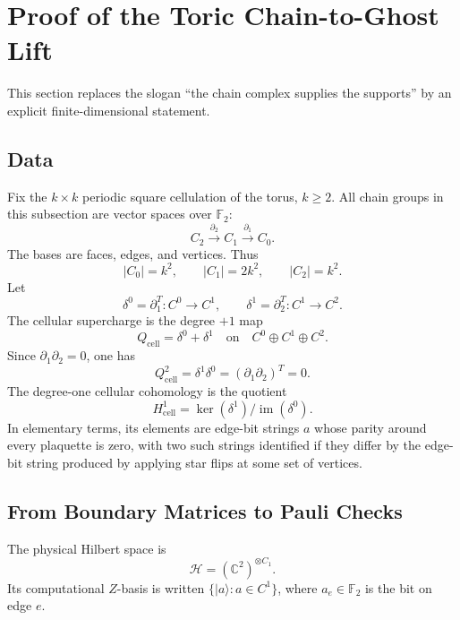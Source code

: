 
\section{Proof of the Toric Chain-to-Ghost Lift}
\label{sec:chain-ghost-proof}

This section replaces the slogan ``the chain complex supplies the supports''
by an explicit finite-dimensional statement.

\subsection{Data}

Fix the \(k\times k\) periodic square cellulation of the torus, \(k\geq 2\).
All chain groups in this subsection are vector spaces over \(\mathbb{F}_2\):
\[
  C_2 \xrightarrow{\partial_2} C_1 \xrightarrow{\partial_1} C_0 .
\]
The bases are faces, edges, and vertices. Thus
\[
  |C_0|=k^2,\qquad |C_1|=2k^2,\qquad |C_2|=k^2 .
\]
Let
\[
  \delta^0=\partial_1^T:C^0\to C^1,\qquad
  \delta^1=\partial_2^T:C^1\to C^2.
\]
The cellular supercharge is the degree \(+1\) map
\[
  Q_{\mathrm{cell}}=\delta^0+\delta^1
  \quad\text{on}\quad C^0\oplus C^1\oplus C^2 .
\]
Since \(\partial_1\partial_2=0\), one has
\[
  Q_{\mathrm{cell}}^2=\delta^1\delta^0=(\partial_1\partial_2)^T=0.
\]
The degree-one cellular cohomology is the quotient
\[
  H^1_{\mathrm{cell}}
  =\ker(\delta^1)/\operatorname{im}(\delta^0).
\]
In elementary terms, its elements are edge-bit strings \(a\) whose parity around
every plaquette is zero, with two such strings identified if they differ by the
edge-bit string produced by applying star flips at some set of vertices.

\subsection{From Boundary Matrices to Pauli Checks}

The physical Hilbert space is
\[
  \mathcal H=(\mathbb C^2)^{\otimes C_1}.
\]
Its computational \(Z\)-basis is written \(\{|a\rangle:a\in C^1\}\), where
\(a_e\in\mathbb{F}_2\) is the bit on edge \(e\).

